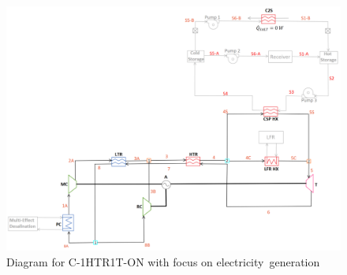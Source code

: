 \documentclass[sustainability,article,accept,moreauthors,pdftex]{Definitions/mdpi}
\begin{document}
\begin{figure}[H] 
    \widefigure
    \includegraphics[width=\linewidth]{Definitions/c-1htr1t-on.pdf}
    \caption{Diagram for C-1HTR1T-ON with focus on electricity~generation\label{c-1htr1t-on}}
\end{figure}
\end{document}
